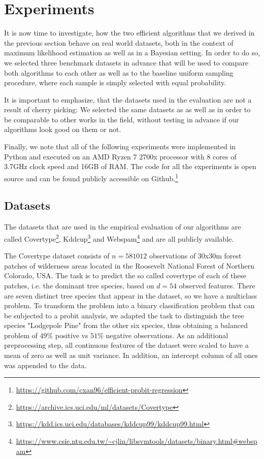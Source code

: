\section{Experiments}

It is now time to investigate, how the two efficient algorithms that
we derived in the previous section behave on real world datasets,
both in the context of maximum likelihood estimation as well as
in a Bayesian setting.
In order to do so, we selected three benchmark datasets in advance
that will be used to compare both algorithms to each other as
well as to the baseline uniform sampling procedure, where each
sample is simply selected with equal probability.

It is important to emphasize, that the datasets used in the evaluation
are not a result of cherry picking: We selected the same datasets
as \cite{on-coresets} as well as \cite{coresets-strengthened}
in order to be comparable to other works in the field, without
testing in advance if our algorithms look good on them or not.

Finally, we note that all of the following experiments were
implemented in Python and executed on an
AMD Ryzen 7 2700x processor with 8 cores of 3.7GHz clock speed
and 16GB of RAM.
The code for all the experiments is open source and can be
found publicly accessible on Github.\footnote{
    \url{https://github.com/cxan96/efficient-probit-regression}
}

\subsection{Datasets}

The datasets that are used in the empirical evaluation of our
algorithms are called Covertype\footnote{
    \url{https://archive.ics.uci.edu/ml/datasets/Covertype}
}, Kddcup\footnote{
    \url{https://kdd.ics.uci.edu/databases/kddcup99/kddcup99.html}
} and Webspam\footnote{
    \url{https://www.csie.ntu.edu.tw/\~cjlin/libsvmtools/datasets/binary.html\#webspam}
} and are
all publicly available.

The Covertype dataset consists of $n=581012$ observations of 30x30m
forest patches of wilderness areas located in the
Roosevelt National Forest of Northern Colorado, USA.
The task is to predict the so called covertype of each of these
patches, i.e. the dominant tree species, based on $d=54$
observed features. There are seven distinct tree species that
appear in the dataset, so we have a multiclass problem. To transform
the problem into a binary classification problem that can be
subjected to a probit analysis, we adapted the task to distinguish the
tree species "Lodgepole Pine" from the other six species, thus
obtaining a balanced problem of $49\%$ positive vs $51\%$ negative
observations.
As an additional preprocessing step, all continuous features of the
dataset were scaled to have a mean of zero as well as unit variance.
In addition, an intercept column of all ones was appended to the data.

